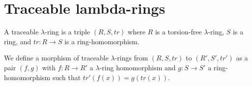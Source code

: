 
\section{Traceable lambda-rings}

\begin{definition}
  A traceable $\lambda$-ring is a triple $(R, S, tr)$ where $R$ is a torsion-free $\lambda$-ring, $S$ is a ring, and $tr: R \to S$ is a ring-homomorphism.  
\end{definition}

\begin{definition}
  We define a morphism of traceable $\lambda$-rings from $(R, S, tr)$ to $(R', S', tr')$ as a pair $(f, g)$ with $f : R \to R'$ a $\lambda$-ring homomorphism and $g : S \to S'$ a ring-homomorphism such that $tr'(f(x)) = g(tr(x))$.
\end{definition}

